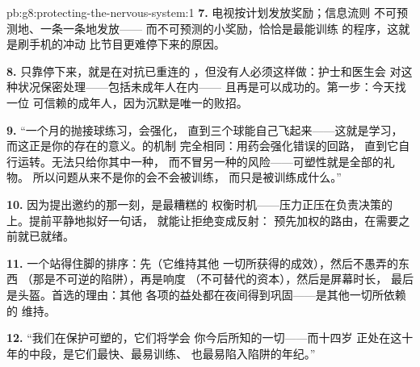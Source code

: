 \begin{solution}{pb:g8:protecting-the-nervous-system:1}
\textbf{7.} 电视按计划发放奖励；信息流则
不可预测地、一条一条地发放——
而不可预测的小奖励，恰恰是最能训练
的程序，这就是刷手机的冲动
比节目更难停下来的原因。

\textbf{8.} 只靠停下来，就是在对抗已重连的
，但没有人必须这样做：护士和医生会
对这种状况保密处理——包括未成年人在内——
且再是可以成功的。第一步：今天找一位
可信赖的成年人，因为沉默是唯一的败招。

\textbf{9.} “一个月的抛接球练习，会强化，
直到三个球能自己飞起来——这就是学习，
而这正是你的存在的意义。的机制
完全相同：用药会强化错误的回路，
直到它自行运转。无法只给你其中一种，
而不冒另一种的风险——可塑性就是全部的礼物。
所以问题从来不是你的会不会被训练，
而只是被训练成什么。”

\textbf{10.} 因为提出邀约的那一刻，是最糟糕的
权衡时机——压力正压在负责决策的
上。提前平静地拟好一句话，
就能让拒绝变成反射：
预先加权的路由，在需要之前就已就绪。

\textbf{11.} 一个站得住脚的排序：先（它维持其他
一切所获得的成效），然后不愚弄的东西
（那是不可逆的陷阱），再是响度
（不可替代的资本），然后是屏幕时长，
最后是头盔。首选的理由：其他
各项的益处都在夜间得到巩固——是其他一切所依赖的
维持。

\textbf{12.} “我们在保护可塑的，它们将学会
你今后所知的一切——而十四岁
正处在这十年的中段，是它们最快、最易训练、
也最易陷入陷阱的年纪。”
\end{solution}
